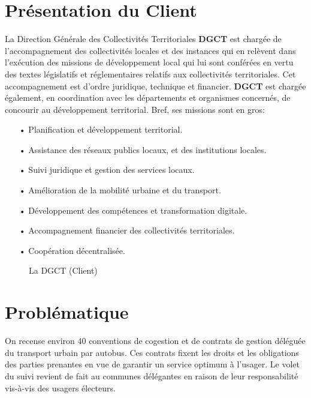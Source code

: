 \section{Présentation du Client}

La Direction Générale des Collectivités Territoriales \textbf{DGCT} est chargée de l’accompagnement des collectivités locales et des instances qui en relèvent dans l’exécution des missions de développement local qui lui  sont conférées en vertu des textes législatifs et réglementaires relatifs aux collectivités
territoriales. Cet accompagnement est d’ordre juridique, technique et financier. \textbf{DGCT} est chargée également, en
coordination avec les départements et organismes concernés, de
concourir au développement territorial. Bref, ses missions sont en gros:
\begin{itemize}
	\item[•] Planification et développement territorial.
	\item[•] Assistance des réseaux publics locaux, et des institutions
	      locales.
	\item[•] Suivi juridique et gestion des services locaux.
	\item[•] Amélioration de la mobilité urbaine et du transport.
	\item[•] Développement des compétences et transformation digitale.
	\item[•] Accompagnement financier des collectivités territoriales.
	\item[•] Coopération décentralisée.
\end{itemize}
\begin{figure}[H]
	\begin{center}
		\caption{La DGCT (Client)}
	\end{center}
\end{figure}
\newpage
\section{Problématique}

On recense environ 40 conventions de cogestion et de contrats de gestion déléguée du transport urbain par autobus. Ces contrats fixent les droits et les obligations des parties prenantes en vue de garantir un service optimum à l’usager. Le volet du suivi revient de fait au communes délégantes en raison de leur responsabilité vis-à-vis des usagers électeurs.


